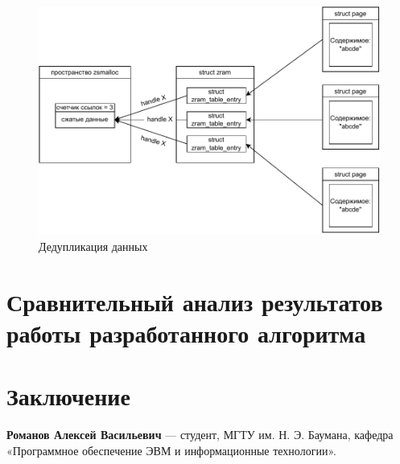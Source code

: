 \documentclass[12pt, a4paper]{article}
\begin{document}
\begin{figure}[h]
	\centering
	\includegraphics[width=\textwidth]{img/zram-no-duplicates.pdf}
	\caption{Дедупликация данных}
	\label{fig:zram-no-duplicates}
\end{figure}


\section{Сравнительный анализ результатов работы разработанного алгоритма}

\section*{Заключение}


\begin{thebibliography}{5}
\end{thebibliography}

\noindent \textbf{Романов Алексей Васильевич} — студент, МГТУ им. Н. Э. Баумана, кафедра «Программное обеспечение ЭВМ и информационные технологии».
\end{document}
